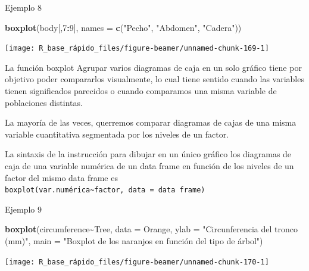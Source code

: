 \documentclass[
  ignorenonframetext,
  aspectratio=169]{beamer}
\newenvironment{Shaded}{\begin{snugshade}}{\end{snugshade}}
\newcommand{\AttributeTok}[1]{\textcolor[rgb]{0.13,0.29,0.53}{#1}}
\newcommand{\DecValTok}[1]{\textcolor[rgb]{0.00,0.00,0.81}{#1}}
\newcommand{\FunctionTok}[1]{\textcolor[rgb]{0.13,0.29,0.53}{\textbf{#1}}}
\newcommand{\NormalTok}[1]{#1}
\newcommand{\SpecialCharTok}[1]{\textcolor[rgb]{0.81,0.36,0.00}{\textbf{#1}}}
\newcommand{\StringTok}[1]{\textcolor[rgb]{0.31,0.60,0.02}{#1}}
\begin{document}
\begin{frame}[fragile]{Ejemplo 8}
\label{ejemplo-8-1}
\begin{Shaded}
\begin{Highlighting}[]
\FunctionTok{boxplot}\NormalTok{(body[,}\DecValTok{7}\SpecialCharTok{:}\DecValTok{9}\NormalTok{], }\AttributeTok{names =} \FunctionTok{c}\NormalTok{(}\StringTok{"Pecho"}\NormalTok{, }\StringTok{"Abdomen"}\NormalTok{, }\StringTok{"Cadera"}\NormalTok{))}
\end{Highlighting}
\end{Shaded}

\begin{center}\texttt{[image: R\_base\_rápido\_files/figure-beamer/unnamed-chunk-169-1]} \end{center}
\end{frame}

\begin{frame}[fragile]{La función boxplot}
\label{la-funciuxf3n-boxplot-3}
Agrupar varios diagramas de caja en un solo gráfico tiene por objetivo
poder compararlos visualmente, lo cual tiene sentido cuando las
variables tienen significados parecidos o cuando comparamos una misma
variable de poblaciones distintas.

La mayoría de las veces, querremos comparar diagramas de cajas de una
misma variable cuantitativa segmentada por los niveles de un factor.

La sintaxis de la instrucción para dibujar en un único gráfico los
diagramas de caja de una variable numérica de un data frame en función
de los niveles de un factor del mismo data frame es
\texttt{boxplot(var.numérica\textasciitilde{}factor,\ data\ =\ data\ frame)}
\end{frame}

\begin{frame}[fragile]{Ejemplo 9}
\label{ejemplo-9}
\begin{Shaded}
\begin{Highlighting}[]
\FunctionTok{boxplot}\NormalTok{(circumference}\SpecialCharTok{\textasciitilde{}}\NormalTok{Tree, }\AttributeTok{data =}\NormalTok{ Orange, }\AttributeTok{ylab =} \StringTok{"Circunferencia del tronco (mm)"}\NormalTok{, }
        \AttributeTok{main =} \StringTok{"Boxplot de los naranjos en función del tipo de árbol"}\NormalTok{)}
\end{Highlighting}
\end{Shaded}

\begin{center}\texttt{[image: R\_base\_rápido\_files/figure-beamer/unnamed-chunk-170-1]} \end{center}
\end{frame}
\end{document}
